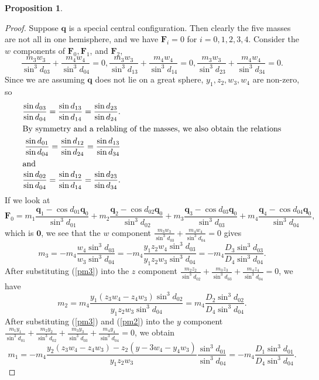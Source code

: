 \documentclass[12pt]{amsart}
\newtheorem{proposition}{Proposition}
\theoremstyle{definition}
\newcommand {\q} {\mathbf{q}}
\newcommand {\F} {\mathbf{F}}
\begin{document}
{\begin{proposition}
\begin{enumerate}
\end{enumerate}
\end{proposition}
\begin{proof}
Suppose $\q$ is a special central configuration. Then clearly the five masses are not all in one hemisphere, and we have $\F_i=0$ for $i=0,1,2,3,4$. Consider the $w$ components of $\F_0, \F_1$, and $\F_2$, $$\frac{m_3w_3}{\sin^3{d_{03}}}+\frac{m_4w_4}{\sin^3{d_{04}}}=0, \frac{m_3w_3}{\sin^3{d_{13}}}+\frac{m_4w_4}{\sin^3{d_{14}}}=0, \frac{m_3w_3}{\sin^3{d_{23}}}+\frac{m_4w_4}{\sin^3{d_{34}}}=0.$$ Since we are assuming $\q$ does not lie on a great sphere, $y_1, z_2, w_3, w_4$ are non-zero, so \begin{align*}\frac{\sin{d_{03}}}{\sin{d_{04}}}=\frac{\sin{d_{13}}}{\sin{d_{14}}}=\frac{\sin{d_{23}}}{\sin{d_{24}}}.\\
\intertext{By symmetry and a relabling of the masses, we also obtain the relations}
\frac{\sin{d_{01}}}{\sin{d_{04}}}=\frac{\sin{d_{12}}}{\sin{d_{24}}}=\frac{\sin{d_{13}}}{\sin{d_{34}}}\\
\intertext{and}
\frac{\sin{d_{02}}}{\sin{d_{04}}}=\frac{\sin{d_{12}}}{\sin{d_{14}}}=\frac{\sin{d_{23}}}{\sin{d_{34}}}.
\end{align*} 
If we look at 
$$
\F_0=m_1\frac{\q_1-\cos{d_{01}}\q_0}{\sin^3{d_{01}}}+m_2\frac{\q_2-\cos{d_{02}}\q_0}{\sin^3{d_{02}}}+m_3\frac{\q_3-\cos{d_{03}}\q_0}{\sin^3{d_{03}}}+m_4\frac{\q_4-\cos{d_{04}}\q_0}{\sin^3{d_{04}}},
$$
which is $\mathbf{0}$,
we see that the $w$ component $\frac{m_3w_3}{\sin^3{d_{03}}}+\frac{m_4w_4}{\sin^3{d_{04}}}=0$ gives 
\begin{equation}
\label{pm3} m_3=-m_4\frac{w_4\sin^3{d_{03}}}{w_3\sin^3{d_{04}}}=-m_4\frac{y_1z_2w_4\sin^3{d_{03}}}{y_1z_2w_3\sin^3{d_{04}}}=-m_4\frac{D_3\sin^3{d_{03}}}{D_4\sin^3{d_{04}}}.\end{equation}
After substituting (\ref{pm3}) into the $z$ component $\frac{m_2z_2}{\sin^3{d_{02}}}+\frac{m_3z_3}{\sin^3{d_{03}}}+\frac{m_4z_4}{\sin^3{d_{04}}}=0$, we have \begin{equation}
\label{pm2} m_2=m_4\frac{y_1(z_3w_4-z_4w_3)\sin^3{d_{02}}}{y_1z_2w_3\sin^3{d_{04}}}=m_4\frac{D_2\sin^3{d_{02}}}{D_4\sin^3{d_{04}}}.\end{equation}
After substituting (\ref{pm3}) and (\ref{pm2}) into the $y$ component $\frac{m_1y_1}{\sin^3{d_{01}}}+\frac{m_2y_2}{\sin^3{d_{02}}}+\frac{m_3y_3}{\sin^3{d_{03}}}+\frac{m_4y_4}{\sin^3{d_{04}}}=0$, we obtain\begin{equation}
\label{pm1} m_1=-m_4\frac{y_2(z_3w_4-z_4w_3)-z_2(y-3w_4-y_4w_3)}{y_1z_2w_3}\frac{\sin^3{d_{01}}}{\sin^3{d_{04}}}=-m_4\frac{D_1\sin^3{d_{01}}}{D_4\sin^3{d_{04}}}.\end{equation}

\end{proof}}
\end{document}
